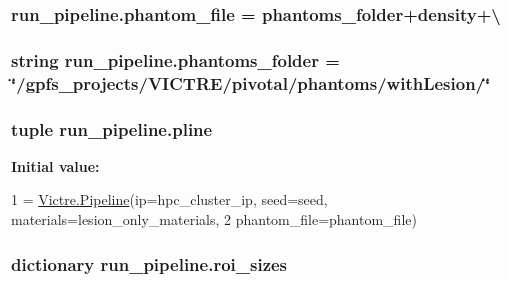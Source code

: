 \hypertarget{namespacerun__pipeline_a52ad572b0cc10acfe4c6f92accf792c8}{
\subsubsection[{phantom\-\_\-file}]{\setlength{\rightskip}{0pt plus 5cm}run\-\_\-pipeline.\-phantom\-\_\-file = {\bf phantoms\-\_\-folder}+{\bf density}+\textbackslash{}}}\label{namespacerun__pipeline_a52ad572b0cc10acfe4c6f92accf792c8}
\hypertarget{namespacerun__pipeline_ad2c440e7163ff7674972217024c82f44}{
\subsubsection[{phantoms\-\_\-folder}]{\setlength{\rightskip}{0pt plus 5cm}string run\-\_\-pipeline.\-phantoms\-\_\-folder = \char`\"{}/gpfs\-\_\-projects/V\-I\-C\-T\-R\-E/pivotal/phantoms/with\-Lesion/\char`\"{}}}\label{namespacerun__pipeline_ad2c440e7163ff7674972217024c82f44}
\hypertarget{namespacerun__pipeline_a27b743dac5fef240f9c04a8664ebe49c}{
\subsubsection[{pline}]{\setlength{\rightskip}{0pt plus 5cm}tuple run\-\_\-pipeline.\-pline}}\label{namespacerun__pipeline_a27b743dac5fef240f9c04a8664ebe49c}
{\bfseries Initial value\-:}
\begin{DoxyCode}
1 = \hyperlink{namespaceVictre_1_1Pipeline}{Victre.Pipeline}(ip=hpc\_cluster\_ip, seed=seed, materials=lesion\_only\_materials,
2                             phantom\_file=phantom\_file)
\end{DoxyCode}
\hypertarget{namespacerun__pipeline_acbbe35ae536f40bcd740b4fa98cd53a1}{
\subsubsection[{roi\-\_\-sizes}]{\setlength{\rightskip}{0pt plus 5cm}dictionary run\-\_\-pipeline.\-roi\-\_\-sizes}}\label{namespacerun__pipeline_acbbe35ae536f40bcd740b4fa98cd53a1}
